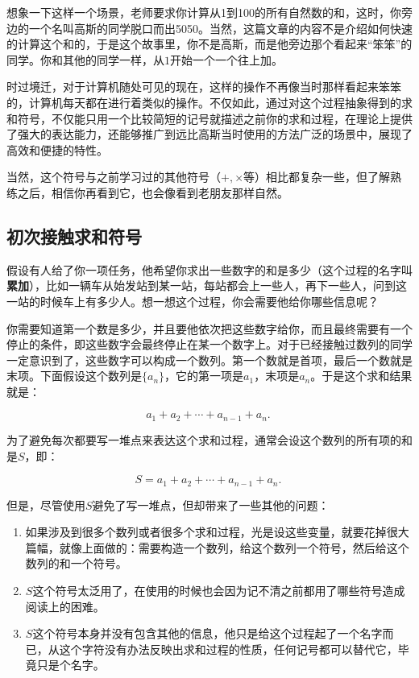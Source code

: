 


想象一下这样一个场景，老师要求你计算从1到100的所有自然数的和，这时，你旁边的一个名叫高斯的同学脱口而出5050。当然，这篇文章的内容不是介绍如何快速的计算这个和的，于是这个故事里，你不是高斯，而是他旁边那个看起来“笨笨”的同学。你和其他的同学一样，从$1$开始一个一个往上加。

时过境迁，对于计算机随处可见的现在，这样的操作不再像当时那样看起来笨笨的，计算机每天都在进行着类似的操作。不仅如此，通过对这个过程抽象得到的求和符号，不仅能只用一个比较简短的记号就描述之前你的求和过程，在理论上提供了强大的表达能力，还能够推广到远比高斯当时使用的方法广泛的场景中，展现了高效和便捷的特性。

当然，这个符号与之前学习过的其他符号（$+,\times$等）相比都复杂一些，但了解熟练之后，相信你再看到它，也会像看到老朋友那样自然。


\subsection{初次接触求和符号}

假设有人给了你一项任务，他希望你求出一些数字的和是多少（这个过程的名字叫\textbf{累加}），比如一辆车从始发站到某一站，每站都会上一些人，再下一些人，问到这一站的时候车上有多少人。想一想这个过程，你会需要他给你哪些信息呢？

你需要知道第一个数是多少，并且要他依次把这些数字给你，而且最终需要有一个停止的条件，即这些数字会最终停止在某一个数字上。对于已经接触过数列的同学一定意识到了，这些数字可以构成一个数列。第一个数就是首项，最后一个数就是末项。下面假设这个数列是$\{a_n\}$，它的第一项是$a_1$，末项是$a_n$。于是这个求和结果就是：

\begin{equation}
a_1+a_2+\cdots+a_{n-1}+a_{n}.~
\end{equation}

为了避免每次都要写一堆点来表达这个求和过程，通常会设这个数列的所有项的和是$S$，即：

\begin{equation}
S=a_1+a_2+\cdots+a_{n-1}+a_{n}.~
\end{equation}

但是，尽管使用$S$避免了写一堆点，但却带来了一些其他的问题：
\begin{enumerate}
\item 如果涉及到很多个数列或者很多个求和过程，光是设这些变量，就要花掉很大篇幅，就像上面做的：需要构造一个数列，给这个数列一个符号，然后给这个数列的和一个符号。
\item $S$这个符号太泛用了，在使用的时候也会因为记不清之前都用了哪些符号造成阅读上的困难。
\item $S$这个符号本身并没有包含其他的信息，他只是给这个过程起了一个名字而已，从这个字符没有办法反映出求和过程的性质，任何记号都可以替代它，毕竟只是个名字。
\end{enumerate}

